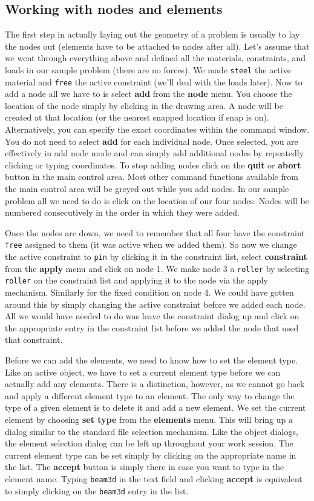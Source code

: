 \subsection{Working with nodes and elements}

The first step in actually laying out the geometry of a problem is usually
to lay the nodes out (elements have to be attached to nodes after all).
Let's assume that we went through everything above and defined 
all the materials, constraints, and loads in our sample problem (there are 
no forces).  We made {\tt steel} the active material and {\tt free} the
active constraint (we'll deal with the loads later).  Now to add a node
all we have to is select {\bf add} from the {\bf node} menu.  
You choose the location of the node simply by clicking in the drawing area.  
A node will be 
created at that location (or the nearest snapped location if snap is on).  
Alternatively, you can specify the exact coordinates within the command 
window.  You do not need to select {\bf add} for each individual node.
Once selected, you are effectively in add node mode and can simply
add additional nodes by repeatedly clicking or typing coordinates.  To stop
adding nodes click on the {\bf quit} or {\bf abort} button in the main
control area.  Most other command functions available from the main
control area will be greyed out while you add nodes.  
In our sample problem all we need to do is click on the
location of our four nodes.  Nodes will be numbered consecutively in 
the order in which they were added.

Once the nodes are down, we need to remember that all four have the
constraint {\tt free} assigned to them (it was active when we added them).  
So now we change the active constraint to {\tt pin} by clicking it in
the constraint list, select {\bf constraint} from the {\bf apply} menu
and click on node 1.  We make node 3 a {\tt roller} by selecting {\tt roller}
on the constraint list and applying it to the node via the apply
mechanism.  Similarly for the fixed condition on node 4.
We could have gotten around this by simply changing the active
constraint before we added each node.  All we would have needed to do was
leave the constraint dialog up and click on the appropriate entry in
the constraint list before we added the node that used that constraint.

Before we can add the elements, we need to know how to set the element
type.  Like an active object, we have to set a current element type before
we can actually add any elements.  There is a distinction, however, as
we cannot go back and apply a different element type to an element.  The
only way to change the type of a given element is to delete it and add
a new element.  We set the current element by choosing {\bf set type}
from the {\bf elements} menu.  This will bring up a dialog similar to
the standard file selection mechanism.  Like the object dialogs, the
element selection dialog can be left up throughout your work session.  
The current element type can be set simply by clicking on the appropriate
name in the list.  The {\bf accept} button is simply there in case you
want to type in the element name.  Typing {\tt beam3d} in the text field
and clicking {\bf accept} is equivalent to simply clicking on the
{\tt beam3d} entry in the list.

